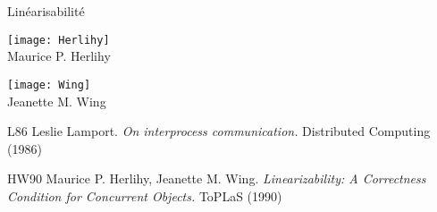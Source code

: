\begin{frame}{Linéarisabilité}
  \vFill
  \hFill
  \begin{minipage}{.6\textwidth}
    \begin{center}
      \texttt{[image: Herlihy]}\\
      Maurice P. Herlihy
    \end{center}
  \end{minipage}
  \hFill
  \begin{minipage}{.28\textwidth}
    \begin{center}
      \texttt{[image: Wing]}\\
      Jeanette M. Wing
    \end{center}
  \end{minipage}
  \hFill

  \vFill
  \begin{citing}
  \item[L86] Leslie Lamport. \textit{On interprocess communication.} Distributed Computing (1986)
  \item[HW90] Maurice P. Herlihy, Jeanette M. Wing. \textit{Linearizability: A Correctness Condition for Concurrent Objects.} ToPLaS (1990)
  \end{citing}
\end{frame}




